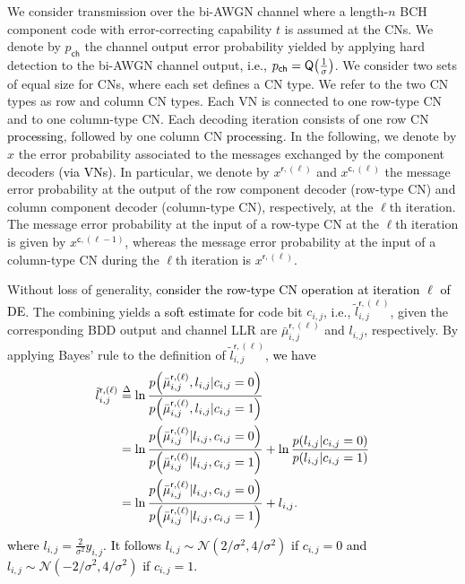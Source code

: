\documentclass[journal]{IEEEtran}
\newcommand{\mep}{{x}}
\newcommand{\row}{\mathsf{r}}
\newcommand{\col}{\mathsf{c}}
\newcommand{\Q}{\mathsf{Q}}
\newcommand{\opt}{\tilde{l}}
\newcommand{\GL}{\textcolor{black}}
\newcommand{\AG}{\textcolor{black}}
\newcommand{\GLC}[1]{\textcolor{black}{\textbf{\textit{#1}}}}
\let\originalleft\left
\let\originalright\right
\renewcommand{\left}{\mathopen{}\mathclose\bgroup\originalleft}
\renewcommand{\right}{\aftergroup\egroup\originalright}
\begin{document}

We consider transmission over the bi-AWGN channel where a length-$n$ BCH component code with error-correcting capability $t$ is assumed at the CNs. 
We denote by $p_\mathsf{ch}$ the channel output error probability yielded by applying hard detection to the bi-AWGN channel output\GL{, i.e.,} $p_\mathsf{ch}=\Q\left(\frac{1}{\sigma}\right)$. We consider two sets of equal size for CNs, where each set defines a CN type. We refer to the two CN types as row and column CN types. Each VN is connected to one row-type CN and to one column-type CN. Each decoding iteration consists of one row CN \GL{processing}, followed by one column CN \GL{processing}. In the following, we denote by $\mep$ the error probability associated to the messages exchanged by the component decoders \GL{(via VNs)}. In particular, we denote by $\mep^{\row,(\ell)}$ and $\mep^{\col,(\ell)}$ the message error probability at the output of the row component decoder (row-type CN) and column component decoder (column-type CN), respectively, at the $\ell$th iteration. The message error probability at the input of a row-type CN at the $\ell$th iteration is given by $\mep^{\col,(\ell-1)}$, whereas the message error probability at the input of a column-type CN during the $\ell$th iteration is $\mep^{\row,(\ell)}$.

Without loss of generality,  \AG{consider the row-type CN operation at iteration $\ell$ of \GL{DE}}.%
The combining yields \GL{a soft estimate for} code bit $c_{i,j}$, i.e., ${\opt}_{i,j}^{\mathsf r,(\ell)}$, given the corresponding BDD output and channel LLR are $\bar{\mu}_{i,j}^{\mathsf r,(\ell)}$ and $l_{i,j}$, respectively. By applying Bayes' rule to the definition of ${\opt}_{i,j}^{\mathsf r,(\ell)}$, \GL{we have}
\GL{\begin{align}
\opt_{i,j}^{\row,(\ell )} & \buildrel \Delta \over = \ln \frac{{p\left( {\bar \mu _{i,j}^{\row,(\ell )},{{l}_{i,j}}|{c_{i,j}} = 0} \right)}}{{p\left( {\bar \mu _{i,j}^{\row,(\ell )},{{l}_{i,j}}|{c_{i,j}} = 1} \right)}} \nonumber \\ & = \ln \frac{{p\left( {\bar \mu _{i,j}^{\row,(\ell )}|{{l}_{i,j}},{c_{i,j}} = 0} \right)}}{{p\left( {\bar \mu _{i,j}^{\row,(\ell )}|{{l}_{i,j}},{c_{i,j}} = 1} \right)}} + \ln \frac{{p\left( {{{l}_{i,j}}|{c_{i,j}} = 0} \right)}}{{p\left( {{{l}_{i,j}}|{c_{i,j}} = 1} \right)}} \nonumber\\
&=\ln \frac{{p\left( {\bar \mu _{i,j}^{\row,(\ell )}|{l_{i,j}},{c_{i,j}} = 0} \right)}}{{p\left( {\bar \mu _{i,j}^{\row,(\ell )}|{l_{i,j}},{c_{i,j}} = 1} \right)}} + l_{i,j}. \label{LLRoutnosimp} 
\end{align} 
where $l_{i,j}=\frac{2}{\sigma^2}y_{i,j}$. \AG{It follows  $l_{i,j}\sim\mathcal{N}(2/\sigma^2,4/\sigma^2)$ if $c_{i,j}=0$ and $l_{i,j}\sim\mathcal{N}(-2/\sigma^2,4/\sigma^2)$ if $c_{i,j}=1$}.} 
\end{document}
